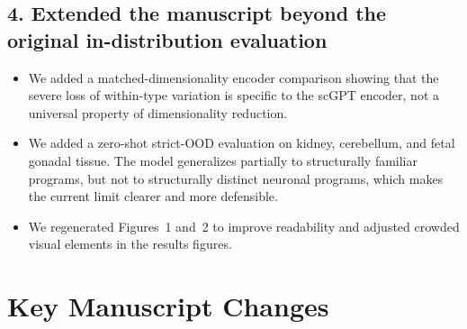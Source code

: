 \documentclass[11pt,letterpaper]{article}
\begin{document}
\subsection*{4. Extended the manuscript beyond the original in-distribution evaluation}

\begin{itemize}
  \item We added a matched-dimensionality encoder comparison showing that the severe loss of
    within-type variation is specific to the scGPT encoder, not a universal property of
    dimensionality reduction.
  \item We added a zero-shot strict-OOD evaluation on kidney, cerebellum, and fetal gonadal
    tissue. The model generalizes partially to structurally familiar programs, but not to
    structurally distinct neuronal programs, which makes the current limit clearer and more
    defensible.
  \item We regenerated Figures~1 and~2 to improve readability and adjusted crowded visual
    elements in the results figures.
\end{itemize}

\section*{Key Manuscript Changes}
\end{document}
